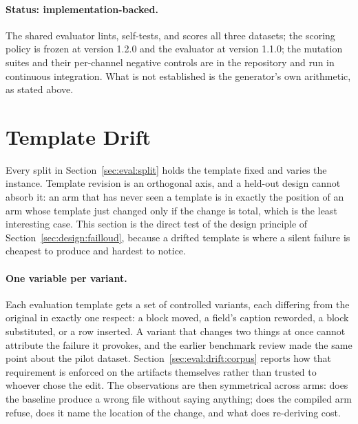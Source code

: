 \paragraph{Status: implementation-backed.}
The shared evaluator lints, self-tests, and scores all three datasets; the scoring policy is
frozen at version 1.2.0 and the evaluator at version 1.1.0; the mutation suites and their per-channel negative controls are in
the repository and run in continuous integration. What is not established is the generator's
own arithmetic, as stated above.

\section{Template Drift}
\label{sec:eval:drift}


Every split in Section~\ref{sec:eval:split} holds the template fixed and varies the instance.
Template revision is an orthogonal axis, and a held-out design cannot absorb it: an arm that
has never seen a template is in exactly the position of an arm whose template just changed
only if the change is total, which is the least interesting case. This section is the direct
test of the design principle of Section~\ref{sec:design:failloud}, because a drifted template
is where a silent failure is cheapest to produce and hardest to notice.

\paragraph{One variable per variant.}
Each evaluation template gets a set of controlled variants, each differing from the original
in exactly one respect: a block moved, a field's caption reworded, a block substituted, or a
row inserted. A variant that changes two things at once cannot attribute the failure it
provokes, and the earlier benchmark review made the same point about the pilot dataset.
Section~\ref{sec:eval:drift:corpus} reports how that requirement is enforced on the artifacts
themselves rather than trusted to whoever chose the edit. The observations are then symmetrical
across arms: does the baseline produce a wrong file without saying anything; does the compiled
arm refuse, does it name the location of the change, and what does re-deriving cost.


